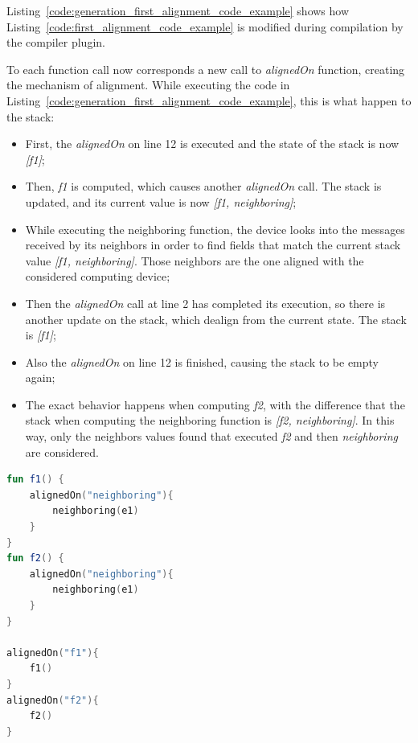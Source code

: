 Listing~\ref{code:generation_first_alignment_code_example} shows how Listing~\ref{code:first_alignment_code_example} is modified during compilation by the compiler plugin.

To each function call now corresponds a new call to \textit{alignedOn} function, creating the mechanism of alignment.\newline
While executing the code in Listing~\ref{code:generation_first_alignment_code_example}, this is what happen to the stack:
\begin{itemize}
    \item First, the \textit{alignedOn} on line 12 is executed and the state of the stack is now \textit{[f1]};
    \item Then, \textit{f1} is computed, which causes another \textit{alignedOn} call. The stack is updated, and its current value is now \textit{[f1, neighboring]};
    \item While executing the neighboring function, the device looks into the messages received by its neighbors in order to find fields that match the current stack value \textit{[f1, neighboring]}. Those neighbors are the one aligned with the considered computing device;
    \item Then the \textit{alignedOn} call at line 2 has completed its execution, so there is another update on the stack, which dealign from the current state. The stack is \textit{[f1]};
    \item Also the \textit{alignedOn} on line 12 is finished, causing the stack to be empty again;
    \item The exact behavior happens when computing \textit{f2}, with the difference that the stack when computing the neighboring function is \textit{[f2, neighboring]}. In this way, only the neighbors values found that executed \textit{f2} and then \textit{neighboring} are considered.
\end{itemize}

\begin{lstlisting}[caption={Generation goal to handle the alignment of Listing~\ref{code:first_alignment_code_example}}, captionpos=b, language=Kotlin, label={code:generation_first_alignment_code_example}]
fun f1() {
    alignedOn("neighboring"){
        neighboring(e1)
    }
}
fun f2() {
    alignedOn("neighboring"){
        neighboring(e1)
    }
}
            
alignedOn("f1"){
    f1()
}
alignedOn("f2"){
    f2()
}
\end{lstlisting}


